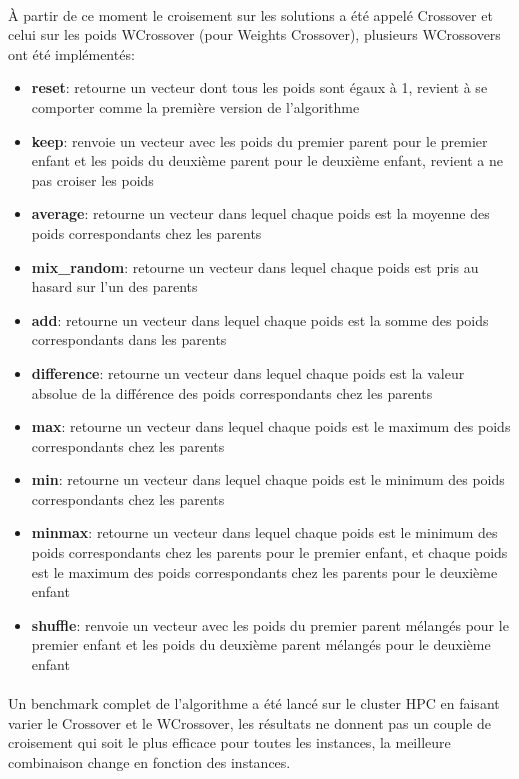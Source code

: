 \documentclass[a4paper,11pt,twoside,french,report]{../common/simplem}
\begin{document}
				\paragraph*{}
					À partir de ce moment le croisement sur les solutions a été appelé Crossover et celui sur les poids WCrossover (pour Weights Crossover), plusieurs WCrossovers ont été implémentés:
					\begin{itemize}
						\item \textbf{reset}: retourne un vecteur dont tous les poids sont égaux à 1, revient à se comporter comme la première version de l'algorithme
						\item \textbf{keep}: renvoie un vecteur avec les poids du premier parent pour le premier enfant et les poids du deuxième parent pour le deuxième enfant, revient a ne pas croiser les poids
						\item \textbf{average}: retourne un vecteur dans lequel chaque poids est la moyenne des poids correspondants chez les parents
						\item \textbf{mix\_random}: retourne un vecteur dans lequel chaque poids est pris au hasard sur l'un des parents
						\item \textbf{add}: retourne un vecteur dans lequel chaque poids est la somme des poids correspondants dans les parents
						\item \textbf{difference}: retourne un vecteur dans lequel chaque poids est la valeur absolue de la différence des poids correspondants chez les parents
						\item \textbf{max}: retourne un vecteur dans lequel chaque poids est le maximum des poids correspondants chez les parents
						\item \textbf{min}: retourne un vecteur dans lequel chaque poids est le minimum des poids correspondants chez les parents
						\item \textbf{minmax}: retourne un vecteur dans lequel chaque poids est le minimum des poids correspondants chez les parents pour le premier enfant, et chaque poids est le maximum des poids correspondants chez les parents pour le deuxième enfant
						\item \textbf{shuffle}: renvoie un vecteur avec les poids du premier parent mélangés pour le premier enfant et les poids du deuxième parent mélangés pour le deuxième enfant
					\end{itemize}
				\paragraph*{}
					Un benchmark complet de l'algorithme a été lancé sur le cluster \gls{HPC} en faisant varier le Crossover et le WCrossover, les résultats ne donnent pas un couple de croisement qui soit le plus efficace pour toutes les instances, la meilleure combinaison change en fonction des instances.
\end{document}
